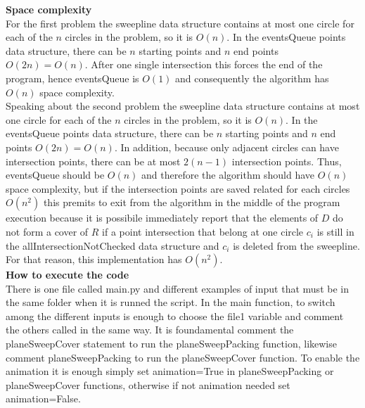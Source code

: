 \documentclass[12pt]{article}
\begin{document}
\noindent \textbf{Space complexity}\\
For the first problem the sweepline data structure contains at most one circle for each of the $n$ circles in the problem, so it is $O(n)$. In the eventsQueue points data structure, there can be $n$ starting points and $n$ end points $O(2n) = O(n)$. After one single intersection this forces the end of the program, hence eventsQueue is $O(1)$ and consequently the algorithm has $O(n)$ space complexity. \\

\noindent Speaking about the second problem the sweepline data structure contains at most one circle for each of the $n$ circles in the problem, so it is $O(n)$. In the eventsQueue points data structure, there can be $n$ starting points and $n$ end points $O(2n) = O(n)$. In addition, because only adjacent circles can have intersection points, there can be at most $2(n - 1)$ intersection points. Thus, eventsQueue should be $O(n)$ and therefore the algorithm should have $O(n)$ space complexity, but if the intersection points are saved related for each circles $O(n^2)$ this premits to exit from the algorithm in the middle of the program execution because it is possibile immediately report that the elements of $D$ do not form a cover of $R$ if a point intersection that belong at one circle $c_i$ is still in the allIntersectionNotChecked data structure and $c_i$ is deleted from the sweepline. For that reason, this implementation has $O(n^2)$. \\

\noindent \textbf{How to execute the code}\\
There is one file called main.py and different examples of input that must be in the same folder when it is runned the script. In the main function, to switch among the different inputs is enough to choose the file1 variable and comment the others called in the same way. It is foundamental comment the planeSweepCover statement to run the planeSweepPacking function, likewise comment planeSweepPacking to run the planeSweepCover function. To enable the animation it is enough simply set animation=True in planeSweepPacking or planeSweepCover functions, otherwise if not animation needed set animation=False.


\end{document}
